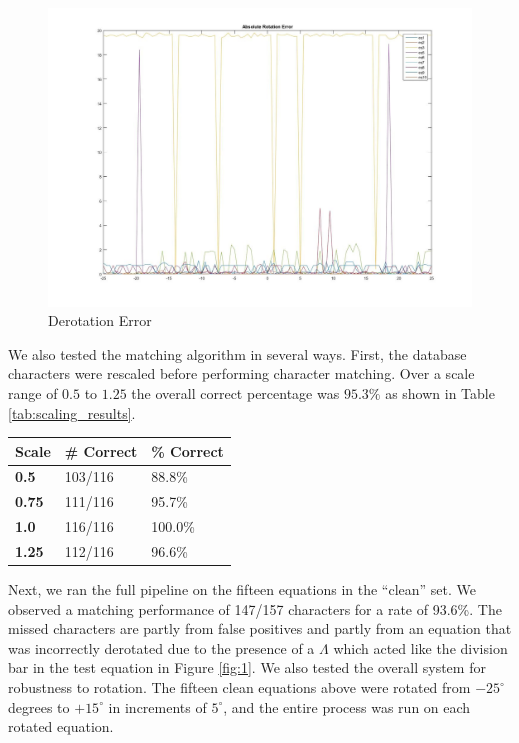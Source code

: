 \documentclass[journal]{IEEEtran}
\begin{document}
\begin{figure}[!t]
    \centering
    \includegraphics[width=\columnwidth]{deskew_results_graph}
    \caption{Derotation Error}
    \label{fig:deskew_graph}
\end{figure}

We also tested the matching algorithm in several ways. First, the database characters were rescaled before performing character matching. Over a scale range of $0.5$ to $1.25$ the overall correct percentage was $95.3\%$ as shown in Table \ref{tab:scaling_results}.

\begin{center}
\begin{minipage}{\columnwidth}
     \label{tab:scaling_results} 
    \begin{tabularx}{\columnwidth}{|X|X|X|}
        \hline
        \textbf{Scale} & \textbf{\# Correct} & \textbf{\% Correct}\\
        \hline
        \hline
        \textbf{0.5} &	103/116 &	88.8\%\\
        \hline
        \textbf{0.75} &	111/116 &	95.7\%\\
        \hline
        \textbf{1.0}	 & 116/116 &	100.0\%\\
        \hline
        \textbf{1.25} &	112/116 &	96.6\%\\
        \hline
    \end{tabularx}    
\end{minipage}
\end{center}

Next, we ran the full pipeline on the fifteen equations in the “clean” set. We observed a matching performance of 147/157 characters for a rate of 93.6\%. The missed characters are partly from false positives and partly from an equation that was incorrectly derotated due to the presence of a $\Lambda$ which acted like the division bar in the test equation in Figure \ref{fig:1}.
We also tested the overall system for robustness to rotation. The fifteen clean equations above were rotated from $-25^\circ$ degrees to $+15^\circ$ in increments of $5^\circ$, and the entire process was run on each rotated equation.
\end{document}
